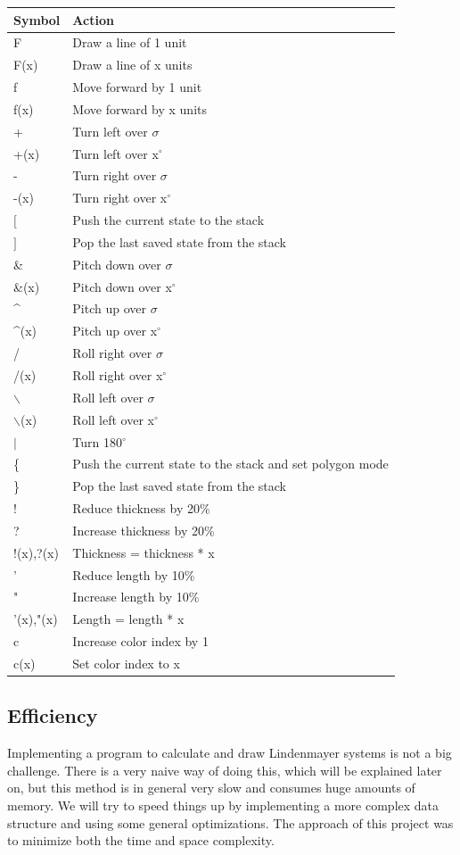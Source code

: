\documentclass[11pt,a4paper]{article}
\newcommand{\degree}{\ensuremath{^\circ}}
\begin{document}
\newpage

\begin{center}
\begin{longtable}{l | l}
Symbol & Action \\ \hline
F & Draw a line of 1 unit \\
F(x) & Draw a line of x units \\
f & Move forward by 1 unit \\
f(x) & Move forward by x units \\
+ & Turn left over $\sigma$ \\
+(x) & Turn left over x\degree \\
- & Turn right over $\sigma$ \\
-(x) & Turn right over x\degree \\
$[$ & Push the current state to the stack \\
$]$ & Pop the last saved state from the stack \\
\& & Pitch down over $\sigma$ \\
\&(x) & Pitch down over x\degree \\
\^{} & Pitch up over $\sigma$ \\
\^{}(x) & Pitch up over x\degree \\
/ & Roll right over $\sigma$ \\
/(x) & Roll right over x\degree \\
$\backslash$ & Roll left over $\sigma$ \\
$\backslash$(x) & Roll left over x\degree \\
$\vert$  & Turn 180\degree \\
\{ & Push the current state to the stack and set polygon mode \\
\} & Pop the last saved state from the stack \\
! & Reduce thickness by 20\% \\
? & Increase thickness by 20\% \\
!(x),?(x) & Thickness = thickness * x \\
' & Reduce length by 10\% \\
" & Increase length by 10\% \\
'(x),"(x) & Length = length * x \\
c & Increase color index by 1 \\
c(x) & Set color index to x \\
\end{longtable}
\end{center}

\subsection{Efficiency} %
Implementing a program to calculate and draw Lindenmayer systems is not a big challenge. There is a very naive way of doing this, which will be explained later on, but this method is in general very slow and consumes huge amounts of memory. We will try to speed things up by implementing a more complex data structure and using some general optimizations. The approach of this project was to minimize both the time and space complexity.
\end{document}

